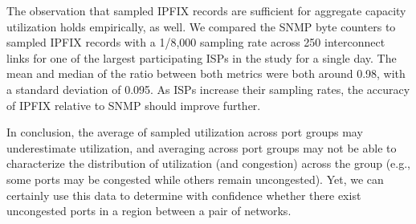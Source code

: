 

The observation
that sampled IPFIX records are sufficient for aggregate capacity
utilization holds empirically, as well. We compared the SNMP byte
counters to sampled IPFIX records with a 1/8,000 sampling rate across
250 interconnect links for one of the largest participating ISPs in the
study for a single day. The mean and median of the ratio
between both metrics were both around 0.98, with a standard deviation of
0.095. As ISPs increase their sampling rates, the accuracy of IPFIX
relative to SNMP should improve further.

In conclusion, the average of sampled utilization across port groups may
underestimate utilization, and averaging across port groups may not be
able to characterize the distribution of utilization (and congestion)
across the group (e.g., some ports may be congested while others remain
uncongested). Yet, we can certainly use this data to determine with confidence
whether there exist uncongested ports in a region between a pair of
networks.


